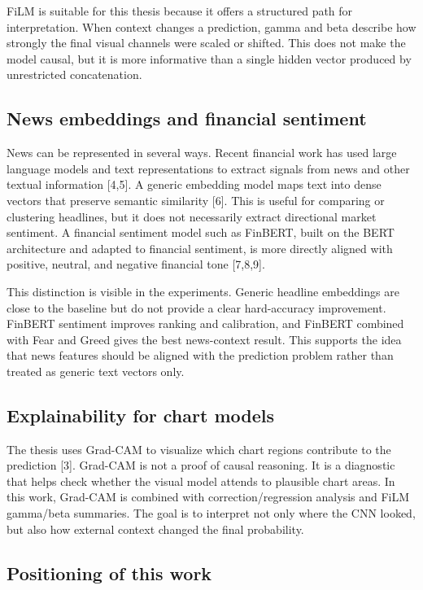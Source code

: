 \documentclass[14pt,a4paper]{extarticle}
\begin{document}
FiLM is suitable for this thesis because it offers a structured path for interpretation. When context changes a prediction, gamma and beta describe how strongly the final visual channels were scaled or shifted. This does not make the model causal, but it is more informative than a single hidden vector produced by unrestricted concatenation.

\subsection{News embeddings and financial sentiment}

News can be represented in several ways. Recent financial work has used large language models and text representations to extract signals from news and other textual information [4,5]. A generic embedding model maps text into dense vectors that preserve semantic similarity [6]. This is useful for comparing or clustering headlines, but it does not necessarily extract directional market sentiment. A financial sentiment model such as FinBERT, built on the BERT architecture and adapted to financial sentiment, is more directly aligned with positive, neutral, and negative financial tone [7,8,9].

This distinction is visible in the experiments. Generic headline embeddings are close to the baseline but do not provide a clear hard-accuracy improvement. FinBERT sentiment improves ranking and calibration, and FinBERT combined with Fear and Greed gives the best news-context result. This supports the idea that news features should be aligned with the prediction problem rather than treated as generic text vectors only.

\subsection{Explainability for chart models}

The thesis uses Grad-CAM to visualize which chart regions contribute to the prediction [3]. Grad-CAM is not a proof of causal reasoning. It is a diagnostic that helps check whether the visual model attends to plausible chart areas. In this work, Grad-CAM is combined with correction/regression analysis and FiLM gamma/beta summaries. The goal is to interpret not only where the CNN looked, but also how external context changed the final probability.

\subsection{Positioning of this work}
\end{document}
